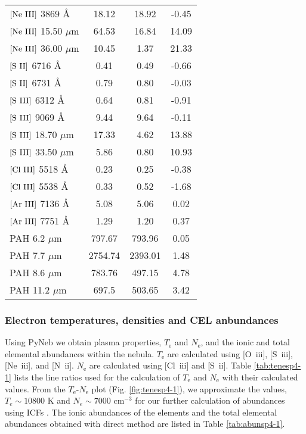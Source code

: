 \documentclass[a4paper,fleqn,usenatbib]{mnras}
\begin{document}
\begin{table}
\begin{tabular}{lccc}
$\mathrm{	[Ne~{\sc	III}]	}$	3869	{\AA}	&	18.12	&	18.92	&	-0.45	\\
$\mathrm{	[Ne~{\sc	III}]	}$	15.50	$\mu$m	&	64.53	&	16.84	&	14.09	\\
$\mathrm{	[Ne~{\sc	III}]	}$	36.00	$\mu$m	&	10.45	&	1.37	&	21.33	\\
$\mathrm{	[S~{\sc	II}]	}$	6716	{\AA}	&	0.41	&	0.49	&	-0.66	\\
$\mathrm{	[S~{\sc	II}]	}$	6731	{\AA}	&	0.79	&	0.80	&	-0.03	\\
$\mathrm{	[S~{\sc	III}]	}$	6312	{\AA}	&	0.64	&	0.81	&	-0.91	\\
$\mathrm{	[S~{\sc	III}]	}$	9069	{\AA}	&	9.44	&	9.64	&	-0.11	\\
$\mathrm{	[S~{\sc	III}]	}$	18.70	$\mu$m	&	17.33	&	4.62	&	13.88	\\
$\mathrm{	[S~{\sc	III}]	}$	33.50	$\mu$m	&	5.86	&	0.80	&	10.93	\\
$\mathrm{	[Cl~{\sc	III}]	}$	5518	{\AA}	&	0.23	&	0.25	&	-0.38	\\
$\mathrm{	[Cl~{\sc	III}]	}$	5538	{\AA}	&	0.33	&	0.52	&	-1.68	\\
$\mathrm{	[Ar~{\sc	III}]	}$	7136	{\AA}	&	5.08	&	5.06	&	0.02	\\
$\mathrm{	[Ar~{\sc	III}]	}$	7751	{\AA}	&	1.29	&	1.20	&	0.37	\\
	PAH			6.2	$\mu$m	&	797.67	&	793.96	&	0.05	\\
	PAH			7.7	$\mu$m	&	2754.74	&	2393.01	&	1.48	\\
	PAH			8.6	$\mu$m	&	783.76	&	497.15	&	4.78	\\
	PAH			11.2	$\mu$m	&	697.5	&	503.65	&	3.42	\\
\hline
\end{tabular}
\end{table}

\subsubsection{Electron temperatures, densities and CEL anbundances} \label{sec:pynebsp4-1}
Using PyNeb we obtain plasma properties, $T_\mathrm{e}$ and $N_\mathrm{e}$, and the ionic and total elemental abundances within the nebula. $T_\mathrm{e}$ are calculated using [O~{\sc iii}], [S~{\sc iii}], [Ne~{\sc iii}], and [N~{\sc ii}]. $N_\mathrm{e}$ are calculated using [Cl~{\sc iii}] and [S~{\sc ii}]. Table \ref{tab:tenesp4-1} lists the line ratios used for the calculation of $T_\mathrm{e}$ and $N_\mathrm{e}$ with their calculated values. From the $T_\mathrm{e}$-$N_\mathrm{e}$ plot (Fig. \ref{fig:tenesp4-1}), we approximate the values, $T_e\sim10800$ K and $N_e\sim7000$ cm$^{-3}$ for our further calculation of abundances using ICFs \citep{2014MNRAS.440..536D}. The ionic abundances of the elements and the total elemental abundances obtained with direct method are listed in Table \ref{tab:abunsp4-1}.
\end{document}
